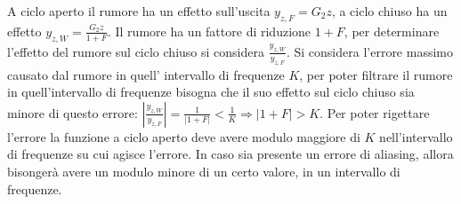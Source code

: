 \documentclass{article}
\numberwithin{equation}{subsection}
\begin{document}
\begin{center}\end{center}

A ciclo aperto il rumore ha un effetto sull'uscita $y_{z,F}=G_2z$, a ciclo chiuso ha un effetto $y_{z,W}=\displaystyle\frac{G_2z}{1+F}$. Il rumore ha un fattore di riduzione 
$1+F$, per determinare l'effetto del rumore sul ciclo chiuso si considera $\displaystyle\frac{y_{z,W}}{y_{z,F}}$. Si considera l'errore massimo causato dal rumore in quell'
intervallo di frequenze $K$, per poter filtrare il rumore in quell'intervallo di frequenze bisogna che il suo effetto sul ciclo chiuso sia minore di questo errore:
$\left|\displaystyle\frac{y_{z,W}}{y_{z,F}}\right|=\frac{1}{|1+F|}<\frac{1}{K}\Rightarrow|1+F|>K$. Per poter rigettare l'errore la funzione a ciclo aperto deve avere 
modulo maggiore di $K$ nell'intervallo di frequenze su cui agisce l'errore. In caso sia presente un errore di aliasing, allora bisongerà avere un modulo minore di un 
certo valore, in un intervallo di frequenze. \\
\end{document}
